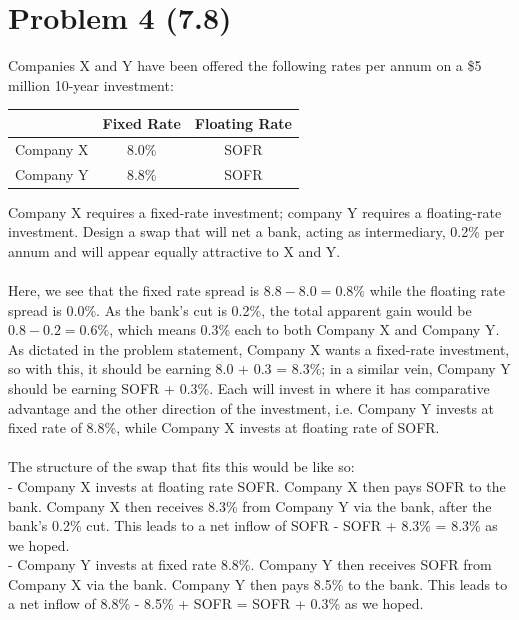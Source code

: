 \documentclass{article}
\begin{document}
{\Large 

\section*{Problem 4 (7.8)}
Companies X and Y have been offered the following rates per annum on a \$5 million 10-year investment:
\begin{center}
\begin{tabular}{ |c|c|c| } 
 \hline
  & Fixed Rate & Floating Rate \\ 
 \hline
 Company X & 8.0\% & SOFR \\ 
 \hline
 Company Y & 8.8\% & SOFR \\ 
 \hline
\end{tabular}
\end{center}
Company X requires a fixed-rate investment; company Y requires a floating-rate investment. Design a swap that will net a bank, acting as intermediary, 0.2\% per annum and will appear equally attractive to X and Y. \\ \\
Here, we see that the fixed rate spread is \(8.8 - 8.0 = 0.8\%\) while the floating rate spread is 0.0\%. As the bank's cut is 0.2\%, the total apparent gain would be \(0.8 - 0.2 = 0.6\%\), which means 0.3\% each to both Company X and Company Y. As dictated in the problem statement, Company X wants a fixed-rate investment, so with this, it should be earning 8.0 + 0.3 = 8.3\%; in a similar vein, Company Y should be earning SOFR + 0.3\%. Each will invest in where it has comparative advantage and the other direction of the investment, i.e. Company Y invests at fixed rate of 8.8\%, while Company X invests at floating rate of SOFR. \\ \\
The structure of the swap that fits this would be like so: \\
- Company X invests at floating rate SOFR. Company X then pays SOFR to the bank. Company X then receives 8.3\% from Company Y via the bank, after the bank's 0.2\% cut. This leads to a net inflow of SOFR - SOFR + 8.3\% = 8.3\% as we hoped. \\
- Company Y invests at fixed rate 8.8\%. Company Y then receives SOFR from Company X via the bank. Company Y then pays 8.5\% to the bank. This leads to a net inflow of 8.8\% - 8.5\% + SOFR = SOFR + 0.3\% as we hoped.

}
\end{document}
